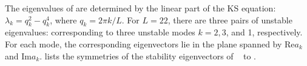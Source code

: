 
The eigenvalues of  are determined by the linear part of the KS
equation: $\lambda_k=q_k^2-q_k^4$, where $q_k = 2\pi k/L$.  For
$L=22$, there are three pairs of unstable eigenvalues: corresponding
to three unstable modes $k=2,3$, and 1, respectively.  For each
mode, the corresponding eigenvectors lie in the plane spanned by
$\mathrm{Re} a_k$ and $\mathrm{Im} a_k$. 
lists the symmetries of the stability eigenvectors of
\eqva\  to .


